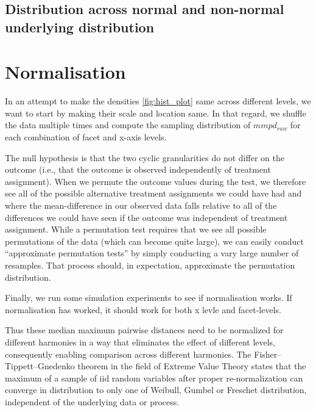 \documentclass[
]{article}
\begin{document}
\hypertarget{distribution-across-normal-and-non-normal-underlying-distribution}{%
\subsection{Distribution across normal and non-normal underlying distribution}\label{distribution-across-normal-and-non-normal-underlying-distribution}}

\hypertarget{normalisation}{%
\section{Normalisation}\label{normalisation}}

In an attempt to make the densities \ref{fig:hist_plot} same across different levels, we want to start by making their scale and location same. In that regard, we shuffle the data multiple times and compute the sampling distribution of \(mmpd_{raw}\) for each combination of facet and x-axis levels.

The null hypothesis is that the two cyclic granularities do not differ on the outcome (i.e., that the outcome is observed independently of treatment assignment). When we permute the outcome values during the test, we therefore see all of the possible alternative treatment assignments we could have had and where the mean-difference in our observed data falls relative to all of the differences we could have seen if the outcome was independent of treatment assignment. While a permutation test requires that we see all possible permutations of the data (which can become quite large), we can easily conduct ``approximate permutation tests'' by simply conducting a vary large number of resamples. That process should, in expectation, approximate the permutation distribution.

Finally, we run some simulation experiments to see if normalisation works. If normalisation has worked, it should work for both x levle and facet-levels.

Thus these median maximum pairwise distances need to be normalized for different harmonies in a way that eliminates the effect of different levels, consequently enabling comparison across different harmonies. The Fisher--Tippett--Gnedenko theorem in the field of Extreme Value Theory states that the maximum of a sample of iid random variables after proper re-normalization can converge in distribution to only one of Weibull, Gumbel or Freschet distribution, independent of the underlying data or process.
\end{document}
